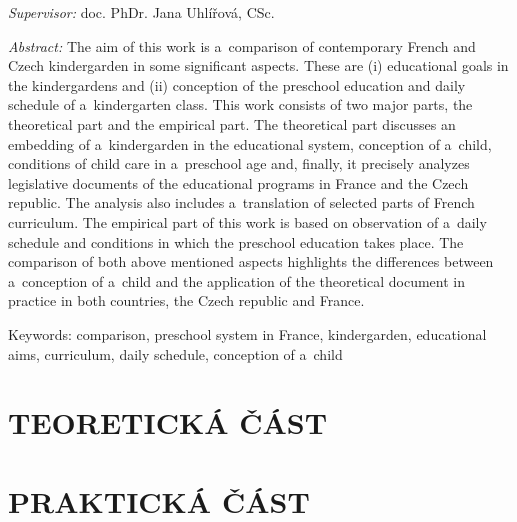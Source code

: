 \documentclass[12pt,a4paper,singleside,openright]{report}
\let\openright=\cleardoublepage
\newcommand{\mujVedouci}{doc. PhDr. Jana Uhlířová, CSc.}
\begin{document}
{	\emph{Supervisor:}
	\mujVedouci
\begin{spacing}{1.0}
	\emph{Abstract:}
	The aim of this work is a~comparison of contemporary French and Czech kindergarden in some significant aspects. These are (i) educational goals in the kindergardens and (ii) conception of the preschool education and daily schedule of a~kindergarten class. This work consists of two major parts, the theoretical part and the empirical part. 
	The theoretical part discusses an embedding of a~kindergarden in the educational system, conception of a~child, conditions of child care in a~preschool age and, finally, it precisely analyzes legislative documents of the educational programs in France and the Czech republic. The analysis also includes a~translation of selected parts of French curriculum. The empirical part of this work is based on observation of a~daily schedule and conditions in which the preschool education takes place. The comparison of both above mentioned aspects highlights the differences between a~conception of a~child and the application of the theoretical document in practice in both countries, the Czech republic and France.
 

	Keywords:
	comparison, preschool system in France, kindergarden, educational aims, curriculum, daily schedule, conception of a~child
\end{spacing}

	\vss}
\newpage


\openright
\pagestyle{plain}
\setcounter{page}{1}  %
\tableofcontents




\part{TEORETICKÁ ČÁST}






\part{PRAKTICKÁ ČÁST}


\end{document}
